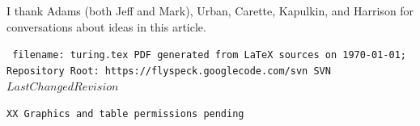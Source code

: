 \documentclass{llncs}
\def\svninfo{{\tt
  filename: turing.tex\hfill\break
  PDF generated from LaTeX sources on \today; \hfill\break
  Repository Root: https://flyspeck.googlecode.com/svn \hfill\break
  SVN $LastChangedRevision$
  }
  }
\def\endnote{{\tt   XX Graphics and table permissions pending}}
\begin{document}
\bigskip

I thank Adams (both Jeff and Mark), Urban, Carette, Kapulkin, and Harrison for conversations
about ideas in this article.


\raggedright



\bigskip
\noindent
\svninfo
\smallskip

\noindent
\endnote
\end{document}
